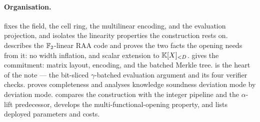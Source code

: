 \paragraph{Organisation.}
 fixes the field, the cell ring, the multilinear
encoding, and the evaluation projection, and isolates the linearity
properties the construction rests on.
 describes the $\mathbb{F}_2$-linear RAA code and proves the two
facts the opening needs from it: no width inflation, and scalar
extension to $\mathbb{K}[X]_{<D}$.
 gives the commitment: matrix layout, encoding, and
the batched Merkle tree.
 is the heart of the note --- the bit-sliced
$\gamma$-batched evaluation argument and its four verifier checks.
 proves completeness and analyses knowledge
soundness deviation mode by deviation mode.
 compares the construction with the integer
pipeline and the $\alpha$-lift predecessor, develops the
multi-functional-opening property, and lists deployed parameters and
costs.

